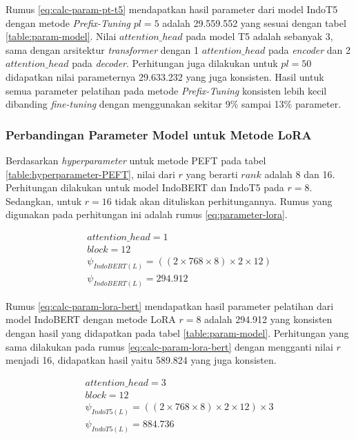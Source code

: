 Rumus \ref{eq:calc-param-pt-t5} mendapatkan hasil parameter dari model IndoT5 dengan metode \textit{Prefix-Tuning} $pl=5$ adalah 29.559.552 yang sesuai dengan tabel \ref{table:param-model}. Nilai $attention\_head$ pada model T5 adalah sebanyak 3, sama dengan arsitektur \textit{transformer} dengan 1 $attention\_head$ pada \textit{encoder} dan 2 $attention\_head$ pada \textit{decoder}. Perhitungan juga dilakukan untuk $pl=50$ didapatkan nilai parameternya 29.633.232 yang juga konsisten. Hasil untuk semua parameter pelatihan pada metode \textit{Prefix-Tuning} konsisten lebih kecil dibanding \textit{fine-tuning} dengan menggunakan sekitar 9\% sampai 13\% parameter.


\subsubsection{Perbandingan Parameter Model untuk Metode LoRA}

Berdasarkan \textit{hyperparameter} untuk metode PEFT pada tabel \ref{table:hyperparameter-PEFT}, nilai dari $r$ yang berarti $rank$ adalah 8 dan 16. Perhitungan dilakukan untuk model IndoBERT dan IndoT5 pada $r=8$. Sedangkan, untuk $r=16$ tidak akan dituliskan perhitungannya. Rumus yang digunakan pada perhitungan ini adalah rumus \ref{eq:parameter-lora}.

\begin{equation}
    \begin{aligned}
        attention\_head = 1 \\
        block = 12 \\
        \psi_{IndoBERT(L)} = ((2 \times 768 \times 8) \times 2 \times 12) \\
        \psi_{IndoBERT(L)} = 294.912
    \end{aligned}
    \label{eq:calc-param-lora-bert}
\end{equation}

Rumus \ref{eq:calc-param-lora-bert} mendapatkan hasil parameter pelatihan dari model IndoBERT dengan metode LoRA $r=8$ adalah 294.912 yang konsisten dengan hasil yang didapatkan pada tabel \ref{table:param-model}. Perhitungan yang sama dilakukan pada rumus \ref{eq:calc-param-lora-bert} dengan mengganti nilai $r$ menjadi 16, didapatkan hasil yaitu 589.824 yang juga konsisten.

\begin{equation}
    \begin{aligned}
        attention\_head = 3 \\
        block = 12 \\
        \psi_{IndoT5(L)} = ((2 \times 768 \times 8) \times 2 \times 12) \times 3 \\
        \psi_{IndoT5(L)} = 884.736
    \end{aligned}
    \label{eq:calc-param-lora-t5}
\end{equation}

